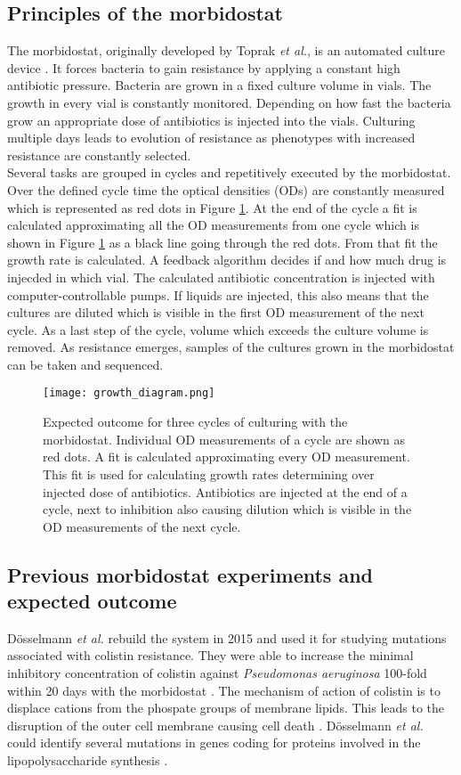 \subsection{Principles of the morbidostat} 
The morbidostat, originally developed by Toprak \textit{et al.}, is an automated culture device \cite{toprak_building_2013}. It forces bacteria to gain resistance by applying a constant high antibiotic pressure. Bacteria are grown in a fixed culture volume in vials. The growth in every vial is constantly monitored. Depending on how fast the bacteria grow an appropriate dose of antibiotics is injected into the vials. Culturing multiple days leads to evolution of resistance as phenotypes with increased resistance are constantly selected. \\
Several tasks are grouped in cycles and repetitively executed by the morbidostat. Over the defined cycle time the optical densities (ODs) are constantly measured which is represented as red dots in Figure \ref{figure:principle}. At the end of the cycle a fit is calculated approximating all the OD measurements from one cycle which is shown in Figure \ref{figure:principle} as a black line going through the red dots. From that fit the growth rate is calculated. A feedback algorithm decides if and how much drug is injecded in which vial. The calculated antibiotic concentration is injected with computer-controllable pumps. If liquids are injected, this also means that the cultures are diluted which is visible in the first OD measurement of the next cycle. As a last step of the cycle, volume which exceeds the culture volume is removed. As resistance emerges, samples of the cultures grown in the morbidostat can be taken and sequenced.    
\begin{figure}
	\texttt{[image: growth\_diagram.png]}
	\caption{Expected outcome for three cycles of culturing with the morbidostat. Individual OD measurements of a cycle are shown as red dots. A fit is calculated approximating every OD measurement. This fit is used for calculating growth rates determining over injected dose of antibiotics. Antibiotics are injected at the end of a cycle, next to inhibition also causing dilution which is visible in the OD measurements of the next cycle.}
	\label{figure:principle}
\end{figure} 

\subsection{Previous morbidostat experiments and expected outcome}
Dösselmann \textit{et al.} rebuild the system in 2015  \cite{doselmann_rapid_2017} and used it for studying mutations associated with colistin resistance. They were able to increase the minimal inhibitory concentration of colistin against \textit{Pseudomonas aeruginosa} 100-fold within 20 days with the morbidostat \cite{doselmann_rapid_2017}. The mechanism of action of colistin is to displace cations from the phospate groups of membrane lipids. This leads to the disruption of the outer cell membrane causing cell death \cite{noauthor_colistin:_nodate}. Dösselmann \textit{et al.} could identify several mutations in genes coding for proteins involved in the lipopolysaccharide synthesis \cite{doselmann_rapid_2017}.

